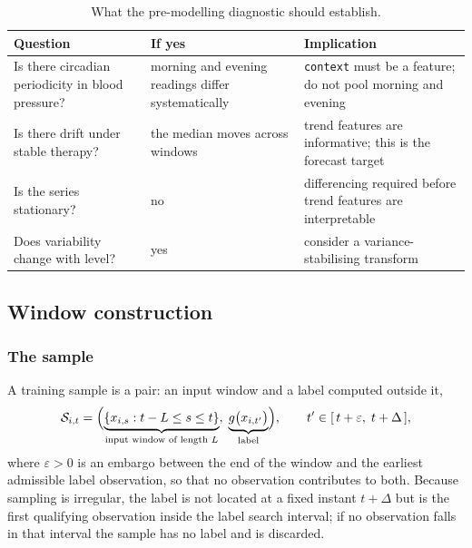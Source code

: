 \documentclass[12pt,a4paper,oneside]{report}
\begin{document}
\begin{table}[htbp]
\centering\footnotesize
\caption{What the pre-modelling diagnostic should establish.}\label{tab:ts-diagnostic}
\begin{tabularx}{\textwidth}{@{}>{\raggedright\arraybackslash}p{4.0cm} >{\raggedright\arraybackslash}p{4.2cm} X@{}}
\toprule
\textbf{Question} & \textbf{If yes} & \textbf{Implication} \\
\midrule
Is there circadian periodicity in blood pressure? & morning and evening readings differ systematically & \texttt{context} must be a feature; do not pool morning and evening \\
Is there drift under stable therapy? & the median moves across windows & trend features are informative; this is the forecast target \\
Is the series stationary? & no & differencing required before trend features are interpretable \\
Does variability change with level? & yes & consider a variance-stabilising transform \\
\bottomrule
\end{tabularx}
\end{table}

\subsection{Window construction}\label{sec:windows}

\subsubsection{The sample}

A training sample is a pair: an input window and a label computed outside it,
\begin{equation}
  \mathcal{S}_{i,t} = \Bigl(
  \underbrace{\{x_{i,s} : t - L \leq s \leq t\}}_{\text{input window of length } L},
  \;
  \underbrace{g\bigl(x_{i,t'}\bigr)}_{\text{label}}
  \Bigr),
  \qquad t' \in [\,t + \varepsilon,\; t + \Delta\,],
\end{equation}
where $\varepsilon > 0$ is an embargo between the end of the window and the earliest admissible label observation, so that no observation contributes to both. Because sampling is irregular, the label is not located at a fixed instant $t+\Delta$ but is the first qualifying observation inside the label search interval; if no observation falls in that interval the sample has no label and is discarded.
\end{document}
